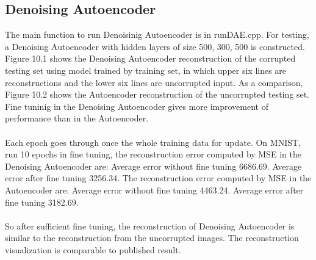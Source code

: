 \documentclass[12pt]{article}
\begin{document}
\subsection{Denoising Autoencoder}
The main function to run Denoisinig Autoencoder is in runDAE.cpp. For testing, a Denoising Autoencoder with hidden layers of size 500, 300, 500 is constructed. Figure 10.1 shows the Denoising Autoencoder reconstruction of the corrupted testing set using model trained by training set, in which upper six lines are reconstructions and the lower six lines are uncorrupted input. As a comparison, Figure 10.2 shows the Autoencoder reconstruction of the uncorrupted testing set. Fine tuninig in the Denoising Autoencoder gives more improvement of performance than in the Autoencoder.\\
\\
Each epoch goes through once the whole training data for update. On MNIST, run 10 epochs in fine tuning, the reconstruction error computed by MSE in the Denoising Autoencoder are: Average error without fine tuning 6686.69. Average error after fine tuning 3256.34. The reconstruction error computed by MSE in the Autoencoder are: Average error without fine tuning 4463.24. Average error after fine tuning 3182.69.\\
\\
So after sufficient fine tuning, the reconstruction of Denoising Autoencoder is similar to the reconstruction from the uncorrupted images. The reconstruction visualization is comparable to published result.\\
\end{document}
